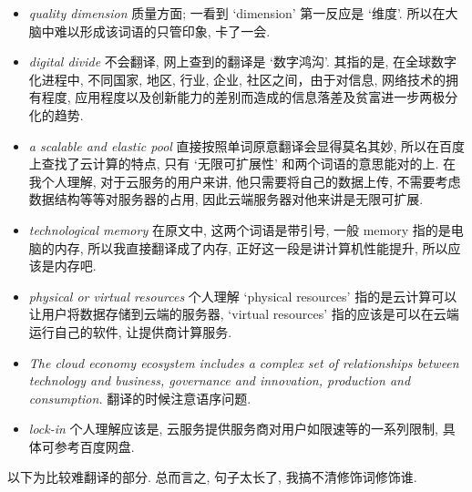 \documentclass[a4paper, UTF8, 12pt]{article}
\begin{document}
\begin{itemize}
    \item \emph{quality dimension} 质量方面; 一看到 `dimension' 第一反应是 `维度'. 所以在大脑中难以形成该词语的只管印象, 卡了一会.
    \item \emph{digital divide} 不会翻译, 网上查到的翻译是 `数字鸿沟'. 其指的是, 在全球数字化进程中, 不同国家, 地区, 行业, 企业, 社区之间，由于对信息, 网络技术的拥有程度, 应用程度以及创新能力的差别而造成的信息落差及贫富进一步两极分化的趋势.
    \item \emph{a scalable and elastic pool} 直接按照单词原意翻译会显得莫名其妙, 所以在百度上查找了云计算的特点, 只有 `无限可扩展性' 和两个词语的意思能对的上. 在我个人理解, 对于云服务的用户来讲, 他只需要将自己的数据上传, 不需要考虑数据结构等等对服务器的占用, 因此云端服务器对他来讲是无限可扩展.
    \item \emph{technological memory} 在原文中, 这两个词语是带引号, 一般 memory 指的是电脑的内存, 所以我直接翻译成了内存, 正好这一段是讲计算机性能提升, 所以应该是内存吧.
    \item \emph{physical or virtual resources} 个人理解 `physical resources' 指的是云计算可以让用户将数据存储到云端的服务器, `virtual resources' 指的应该是可以在云端运行自己的软件, 让提供商计算服务.
    \item \emph{The cloud economy ecosystem includes a complex set of relationships between technology and business, governance and innovation, production and consumption.} 翻译的时候注意语序问题.
    \item \emph{lock-in} 个人理解应该是, 云服务提供服务商对用户如限速等的一系列限制, 具体可参考百度网盘.
\end{itemize}

以下为比较难翻译的部分. 总而言之, 句子太长了, 我搞不清修饰词修饰谁.
\end{document}
